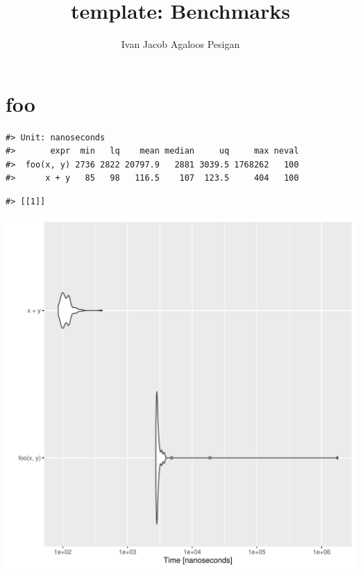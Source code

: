 \documentclass{article}\usepackage[]{graphicx}\usepackage{xcolor}
\title{template: Benchmarks}
\author{Ivan Jacob Agaloos Pesigan}
\date{}
\makeatletter
\newenvironment{kframe}{%
 \def\at@end@of@kframe{}%
 \ifinner\ifhmode%
  \def\at@end@of@kframe{\end{minipage}}%
  \begin{minipage}{\columnwidth}%
 \fi\fi%
 \def\FrameCommand##1{\hskip\@totalleftmargin \hskip-\fboxsep
 \colorbox{shadecolor}{##1}\hskip-\fboxsep
     \hskip-\linewidth \hskip-\@totalleftmargin \hskip\columnwidth}%
 \MakeFramed {\advance\hsize-\width
   \@totalleftmargin\z@ \linewidth\hsize
   \@setminipage}}%
 {\par\unskip\endMakeFramed%
 \at@end@of@kframe}
\newenvironment{knitrout}{}{} %
\makeatother
\begin{document}
\maketitle







\section{foo}



\begin{knitrout}
\color{fgcolor}\begin{kframe}
\begin{verbatim}
#> Unit: nanoseconds
#>       expr  min   lq    mean median     uq     max neval
#>  foo(x, y) 2736 2822 20797.9   2881 3039.5 1768262   100
#>      x + y   85   98   116.5    107  123.5     404   100
\end{verbatim}


{\ttfamily\noindent\itshape\color{messagecolor}{\#> Coordinate system already present. Adding new coordinate system, which will replace the existing one.}}\begin{verbatim}
#> [[1]]
\end{verbatim}
\end{kframe}
\includegraphics[width=1\linewidth]{man/figures/latex-test-benchmark-template-foo-1} 

\end{knitrout}
\end{document}
